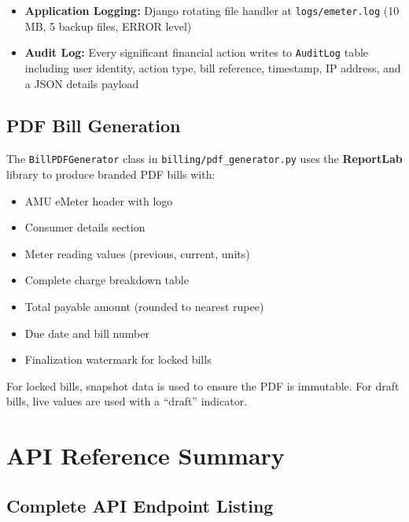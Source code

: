 \documentclass[12pt, a4paper]{report}
\newenvironment{featurelist}{%
    \begin{itemize}[leftmargin=1.5em, itemsep=2pt, parsep=0pt]
}{%
    \end{itemize}
}
\begin{document}
\begin{featurelist}
    \item \textbf{Application Logging:} Django rotating file handler at \texttt{logs/emeter.log} (10 MB, 5 backup files, ERROR level)
    \item \textbf{Audit Log:} Every significant financial action writes to \texttt{AuditLog} table including user identity, action type, bill reference, timestamp, IP address, and a JSON details payload
\end{featurelist}

\section{PDF Bill Generation}

The \texttt{BillPDFGenerator} class in \texttt{billing/pdf\_generator.py} uses the \textbf{ReportLab} library to produce branded PDF bills with:
\begin{featurelist}
    \item AMU eMeter header with logo
    \item Consumer details section
    \item Meter reading values (previous, current, units)
    \item Complete charge breakdown table
    \item Total payable amount (rounded to nearest rupee)
    \item Due date and bill number
    \item Finalization watermark for locked bills
\end{featurelist}

For locked bills, snapshot data is used to ensure the PDF is immutable. For draft bills, live values are used with a ``draft'' indicator.

\chapter{API Reference Summary}

\section{Complete API Endpoint Listing}
\end{document}
